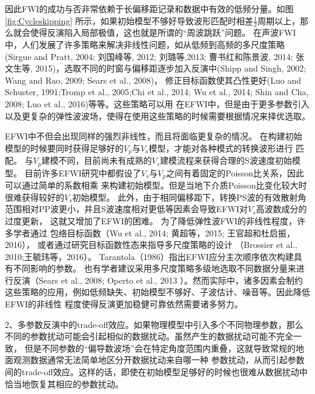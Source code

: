 因此FWI的成功与否非常依赖于长偏移距记录和数据中有效的低频分量。如图\ref{fig:Cycleskipping}
所示，如果初始模型不够好导致波形匹配时相差$\frac{1}{2}$周期以上，那么就会使得反演陷入局部极值，这也就是所谓的“周波跳跃”问题。
在声波FWI中，人们发展了许多策略来解决非线性问题，如从低频到高频的多尺度策略(Sirgue and
Pratt, 2004\cite{sirgue.pratt:2004}; 刘国峰等, 2012\cite{刘国峰2012};
刘璐等,2013\cite{刘璐2013}; 曹书红和陈景波, 2014\cite{曹书红2014}; 
张文生等, 2015\cite{张文生2015})，选取不同的时窗与偏移距逐步加入反演中(Shipp and
Singh, 2002\cite{shipp:2002}; Wang and Rao, 2009\cite{WangEtAl2009}; Sears et al., 2008\cite{sears2008})，
修正目标函数使其凸性更好(Luo and Schuster, 1991\cite{luo1991};Tromp et al.,
2005\cite{tromp2005seismic};Chi
et al., 2014\cite{ChiEtAl2014}; Wu et al., 2014\cite{Wu2014b}; Shin and Cha,
2008\cite{shin.cha:2008}; Luo et al., 2016\cite{Luo2016})等等。这些策略可以用
在EFWI中，但是由于更多参数引入以及更复杂的弹性波波场，使得在使用这些策略的时候需要根据情况来择优选取。

EFWI中不但会出现同样的强烈非线性，而且将面临更复杂的情况。
在构建初始模型的时候要同时获得足够好的$V_p$与$V_s$模型，才能对各种模式的转换波形进行
匹配。
与$V_p$建模不同，目前尚未有成熟的$V_s$建模流程来获得合理的S波速度初始模型。
目前许多EFWI研究中都假设了$V_s$与$V_p$之间有着固定的Poisson比关系，因此可以通过简单的系数相乘
来构建初始模型。但是当地下介质Poisson比变化较大时很难获得较好的$V_s$初始模型。
此外，由于相同偏移距下，转换PS波的有效散射角范围相对PP波更小，并且S波速度相对更低等因素会导致EFWI对$V_s$高波数成分的过度更新，
这就又增加了EFWI的困难。
为了降低弹性波FWI的非线性程度，许多学者通过
包络目标函数（Wu et al., 2014\cite{Wu2014b}; 黄超等，2015\cite{黄超2015};
王官超和杜启振，2016\cite{王官超2016}），
或者通过研究目标函数性态来指导多尺度策略的设计
（Brossier et al., 2010\cite{BrossierEtAl2010};王毓玮等，2016\cite{王毓玮2016}）。
Tarantola（1986）\cite{tarantola:1986}指出EFWI应分主次顺序依次构建具有不同影响的参数。
也有学者建议采用多尺度策略多级地选取不同数据分量来进行反演（Sears et al., 2008\cite{sears2008}; Operto et al., 2013
\cite{operto2013guided}）。然而实际中，诸多因素会制约这些策略的应用，例如低频缺失、初始模型不够好、子波估计、噪音等。因此降低EFWI的非线性
程度使得反演更加稳健可靠依然需要诸多努力。

2、多参数反演中的trade-off效应。如果物理模型中引入多个不同物理参数，那么不同的参数扰动可能会引起相似的数据扰动。虽然产生的数据扰动可能不完全一致，
但是不同参数的“偏导数波场\cite{pratt1998gauss}”会在特定角度范围内重叠，这就导致常规的地面观测数据通常无法简单地区分开数据扰动来自哪一种
参数扰动，从而引起参数间的trade-off效应。这样的话，即使在初始模型足够好的时候也很难从数据扰动中恰当地恢复其相应的参数扰动。

